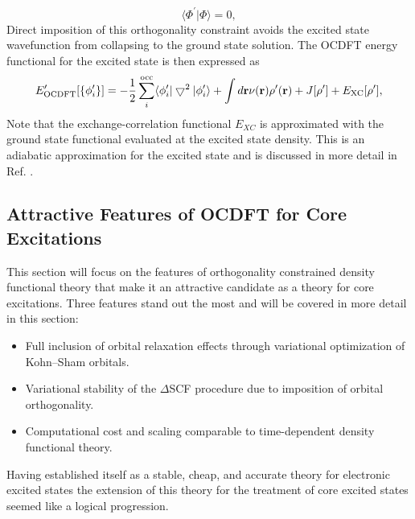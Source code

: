 \documentclass{article}
\begin{document}
\begin{equation}
\langle \Phi^{\prime}|\Phi \rangle = 0,
\end{equation}
Direct imposition of this orthogonality constraint avoids the excited state wavefunction from collapsing to the ground state solution. The OCDFT energy functional for the excited state is then expressed as
\begin{equation}
E^{\prime}_{\rm OCDFT}[\{\phi^{\prime}_i\}] = - \frac{1}{2} \sum^{\rm occ}_i \langle \phi^{\prime}_i| \bigtriangledown^2 | \phi^{\prime}_i \rangle + \int d\mathbf{r} \nu(\mathbf{r}) \rho^{\prime}(\mathbf{r}) + J[\rho^{\prime}] + E_{\rm XC}[\rho^{\prime}],
\end{equation}
Note that the exchange-correlation functional $E_{XC}$ is approximated with the ground state functional evaluated at the excited state density. This is an adiabatic approximation for the excited state and is discussed in more detail in Ref. . 
\subsection{Attractive Features of OCDFT for Core Excitations}
This section will focus on the features of orthogonality constrained density functional theory that make it an attractive candidate as a theory for core excitations. Three features stand out the most and will be covered in more detail in this section:
\begin{itemize}
\item Full inclusion of orbital relaxation effects through variational optimization of Kohn--Sham orbitals.
\item Variational stability of the $\Delta$SCF procedure due to imposition of orbital orthogonality.
\item Computational cost and scaling comparable to time-dependent density functional theory.
\end{itemize}
Having established itself as a stable, cheap, and accurate theory for electronic excited states the extension of this theory for the treatment of core excited states seemed like a logical progression.
\end{document}

